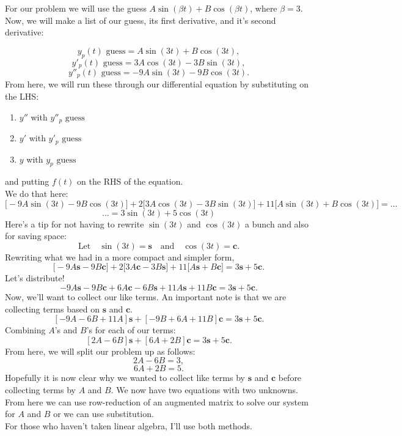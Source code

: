 \documentclass[a4paper,12pt]{article}
\begin{document}
For our problem we will use the guess $A\sin(\beta t) + B\cos(\beta t)$, where $\beta = 3.$\\
Now, we will make a list of our guess, its first derivative, and it's second derivative:

$$ y_p(t) \text{ guess} = A\sin(3t) + B\cos(3t), $$
$$ y'_p(t) \text{ guess} = 3A\cos(3t) - 3B\sin(3t), $$
$$ y''_p(t) \text{ guess} = -9A\sin(3t) - 9B\cos(3t). $$
From here, we will run these through our differential equation by substituting on the LHS:
\begin{enumerate}
	\item $y''$ with $y''_p\text{ guess}$
	\item $y'$ with $y'_p\text{ guess}$
	\item $y$ with $y_p\text{ guess}$
\end{enumerate}
and putting $f(t)$ on the RHS of the equation.\\

We do that here:
$$ \bigg[-9A\sin(3t) - 9B\cos(3t)\bigg] + 2\bigg[3A\cos(3t) - 3B\sin(3t)\bigg] + 11\bigg[A\sin(3t) + B\cos(3t)\bigg] = \ldots$$
$$...= 3\sin(3t) + 5\cos(3t)$$
Here's a tip for not having to rewrite $\sin{(3t)}$ and $\cos{(3t)}$ a bunch and also for saving space: 
$$\text{Let}\quad\sin{(3t)} = \mathbf{s} \quad\text{and}\quad \cos{(3t)} = \mathbf{c}.$$
Rewriting what we had in a more compact and simpler form,
$$ \big[-9A\mathbf{s} - 9B\mathbf{c}\big] + 2\big[3A\mathbf{c} - 3B\mathbf{s}\big] + 11\big[A\mathbf{s} + B\mathbf{c} \big] = 3\mathbf{s} + 5\mathbf{c}. $$
Let's distribute!
$$ -9A\mathbf s - 9B\mathbf c + 6A\mathbf c - 6B\mathbf s + 11A\mathbf s + 11B\mathbf c = 3\mathbf s + 5 \mathbf c . $$
Now, we'll want to collect our like terms. An important note is that we are collecting terms based on $\mathbf s$ and $\mathbf c$.
$$ [-9A-6B + 11A]\mathbf{s} + [-9B + 6A + 11B]\mathbf{c}  = 3\mathbf{s} + 5\mathbf{c}.$$
Combining $A$'s and $B$'s for each of our terms:
$$ [2A - 6B]\mathbf{s} + [6A + 2B]\mathbf{c} = 3\mathbf{s} + 5\mathbf{c}. $$
From here, we will split our problem up as follows:
$$ 2A - 6B = 3, $$
$$ 6A + 2B = 5. $$
Hopefully it is now clear why we wanted to collect like terms by $\mathbf{s}$ and $\mathbf{c}$ before collecting terms by $A$ and $B$. We now have two equations with two unknowns.\\

From here we can use row-reduction of an augmented matrix to solve our system for $A$ and $B$ or we can use substitution.\\
For those who haven't taken linear algebra, I'll use both methods.
\end{document}
